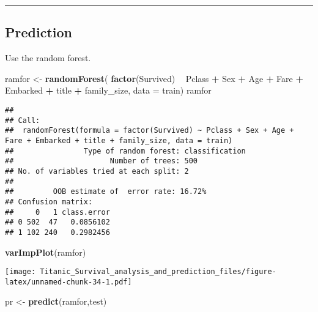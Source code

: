 \documentclass[]{article}
\newenvironment{Shaded}{\begin{snugshade}}{\end{snugshade}}
\newcommand{\KeywordTok}[1]{\textcolor[rgb]{0.13,0.29,0.53}{\textbf{#1}}}
\newcommand{\DataTypeTok}[1]{\textcolor[rgb]{0.13,0.29,0.53}{#1}}
\newcommand{\StringTok}[1]{\textcolor[rgb]{0.31,0.60,0.02}{#1}}
\newcommand{\OperatorTok}[1]{\textcolor[rgb]{0.81,0.36,0.00}{\textbf{#1}}}
\newcommand{\NormalTok}[1]{#1}
\begin{document}
\begin{center}\rule{0.5\linewidth}{\linethickness}\end{center}

\subsection{Prediction}\label{prediction}

Use the random forest.

\begin{Shaded}
\begin{Highlighting}[]
\NormalTok{ramfor <-}\StringTok{ }\KeywordTok{randomForest}\NormalTok{( }\KeywordTok{factor}\NormalTok{(Survived) }\OperatorTok{~}\StringTok{ }\NormalTok{Pclass }\OperatorTok{+}\StringTok{ }\NormalTok{Sex }\OperatorTok{+}\StringTok{ }\NormalTok{Age }\OperatorTok{+}\StringTok{ }\NormalTok{Fare }\OperatorTok{+}\StringTok{ }\NormalTok{Embarked }\OperatorTok{+}\StringTok{ }\NormalTok{title }\OperatorTok{+}\StringTok{ }\NormalTok{family_size, }\DataTypeTok{data =}\NormalTok{ train)}
\NormalTok{ramfor}
\end{Highlighting}
\end{Shaded}

\begin{verbatim}
## 
## Call:
##  randomForest(formula = factor(Survived) ~ Pclass + Sex + Age +      Fare + Embarked + title + family_size, data = train) 
##                Type of random forest: classification
##                      Number of trees: 500
## No. of variables tried at each split: 2
## 
##         OOB estimate of  error rate: 16.72%
## Confusion matrix:
##     0   1 class.error
## 0 502  47   0.0856102
## 1 102 240   0.2982456
\end{verbatim}

\begin{Shaded}
\begin{Highlighting}[]
\KeywordTok{varImpPlot}\NormalTok{(ramfor)}
\end{Highlighting}
\end{Shaded}

\texttt{[image: Titanic\_Survival\_analysis\_and\_prediction\_files/figure-latex/unnamed-chunk-34-1.pdf]}

\begin{Shaded}
\begin{Highlighting}[]
\NormalTok{pr <-}\StringTok{ }\KeywordTok{predict}\NormalTok{(ramfor,test)}
\end{Highlighting}
\end{Shaded}
\end{document}
